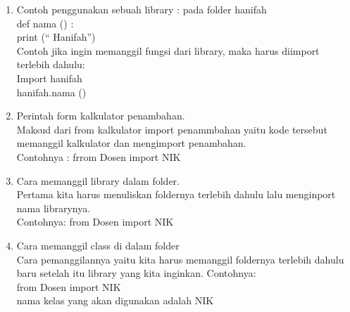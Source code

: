 \begin{enumerate}
	\item Contoh penggunakan sebuah library : pada folder hanifah\\
	def  nama () :\\
	print (“ Hanifah”)\\
	Contoh jika ingin memanggil fungsi dari library, maka harus diimport terlebih dahulu:\\
	Import hanifah\\
	hanifah.nama ()\\
	
	\item Perintah form kalkulator penambahan.\\
	Maksud dari from kalkulator import penammbahan yaitu kode tersebut memanggil kalkulator dan mengimport penambahan.\\
	Contohnya : frrom Dosen import NIK\\
	
	\item Cara memanggil library dalam folder.\\
	Pertama kita harus menuliskan foldernya terlebih dahulu lalu menginport nama librarynya.\\
    Contohnya: from Dosen import NIK\\ 
	
	\item Cara memanggil class di dalam folder\\
	Cara pemanggilannya yaitu kita harus memanggil foldernya terlebih dahulu baru setelah itu library yang kita inginkan. Contohnya:\\
	from Dosen import NIK\\
	nama kelas yang akan digunakan adalah NIK\\
	


\end{enumerate}

